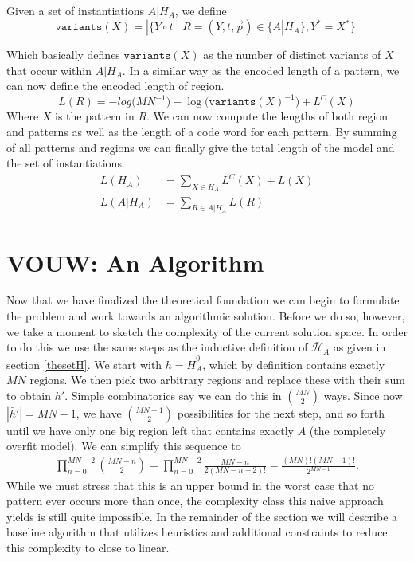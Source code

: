 \documentclass{llncs}
\begin{document}
\begin{definition}
Given a set of instantiations $A|H_A$, we define
$$\mathtt{variants}(X) = |\{Y\circ t\mid R=(Y,t,\vec{p}) \in \{A|H_A\}, Y^*=X^*\}|$$
\end{definition}
Which basically defines $\mathtt{variants}(X)$ as the number of distinct variants of $X$ that occur within $A|H_A$. In a similar way as the encoded length of a pattern, we can now define the encoded length of region.
$$
L(R) = -log\big(MN^{-1}\big) -\log\big(\mathtt{variants}(X)^{-1}\big) + L^C(X)
$$
Where $X$ is the pattern in $R$.
We can now compute the lengths of both region and patterns as well as the length of a code word for each pattern. By summing of all patterns and regions we can finally give the total length of the model and the set of instantiations.
\begin{align*}
L(H_A) &= \displaystyle\sum_{X\in H_A} L^C(X) + L(X) \\
L(A|H_A) &= \displaystyle\sum_{R\in A|H_A} L(R)
\end{align*}


\section{VOUW: An Algorithm}

Now that we have finalized the theoretical foundation we can begin to formulate the problem and work towards an algorithmic solution. Before we do so, however, we take a moment to sketch the complexity of the current solution space. In order to do this we use the same steps as the inductive definition of $\bar{\mathcal{H}}_A$ as given in section \ref{thesetH}. We start with $\bar{h}=\bar{H}_A^0$, which by definition contains exactly $MN$ regions. We then pick two arbitrary regions and replace these with their sum to obtain $\bar{h}'$. Simple combinatorics say we can do this in $\binom{MN}{2}$ ways. Since now $|\bar{h}'| = MN-1$, we have $\binom{MN-1}{2}$ possibilities for the next step, and so forth until we have only one big region left that contains exactly $A$ (the completely overfit model). We can simplify this sequence to
\begin{align}
\displaystyle\prod^{MN-2}_{n=0} \binom{MN-n}{2} = \displaystyle\prod^{MN-2}_{n=0} \frac{MN-n}{2(MN-n-2)!} = \frac{(MN)!(MN-1)!}{2^{MN-1}} .
\end{align}
While we must stress that this is an upper bound in the worst case that no pattern ever occurs more than once, the complexity class this naive approach yields is still quite impossible. In the remainder of the section we will describe a baseline algorithm that utilizes heuristics and additional constraints to reduce this complexity to close to linear.
\end{document}
